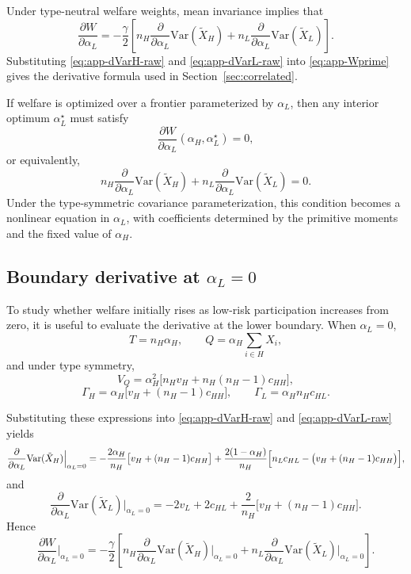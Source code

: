 \documentclass[a4paper,12pt]{article}
\theoremstyle{definition}
\theoremstyle{remark}
\newcommand{\Var}{\mathrm{Var}}
\newcommand{\1}{\mathbf{1}}
\begin{document}
Under type-neutral welfare weights, mean invariance implies that
\begin{equation}
\frac{\partial W}{\partial \alpha_L}
=
-\frac{\gamma}{2}
\left[
n_H\frac{\partial}{\partial \alpha_L}\Var(\tilde X_H)
+
n_L\frac{\partial}{\partial \alpha_L}\Var(\tilde X_L)
\right].
\label{eq:app-Wprime}
\end{equation}
Substituting \eqref{eq:app-dVarH-raw} and \eqref{eq:app-dVarL-raw} into
\eqref{eq:app-Wprime} gives the derivative formula used in
Section~\ref{sec:correlated}.

If welfare is optimized over a frontier parameterized by \(\alpha_L\), then any
interior optimum \(\alpha_L^\star\) must satisfy
\begin{equation}
\frac{\partial W}{\partial \alpha_L}(\alpha_H,\alpha_L^\star)=0,
\label{eq:app-FOC}
\end{equation}
or equivalently,
\begin{equation}
n_H\frac{\partial}{\partial \alpha_L}\Var(\tilde X_H)
+
n_L\frac{\partial}{\partial \alpha_L}\Var(\tilde X_L)
=0.
\label{eq:app-FOC-var}
\end{equation}
Under the type-symmetric covariance parameterization, this condition becomes a
nonlinear equation in \(\alpha_L\), with coefficients determined by the
primitive moments and the fixed value of \(\alpha_H\).

\subsection{Boundary derivative at \texorpdfstring{\(\alpha_L=0\)}{alphaL=0}}
\label{app:alphaL-boundary}

To study whether welfare initially rises as low-risk participation increases
from zero, it is useful to evaluate the derivative at the lower boundary. When
\(\alpha_L=0\),
\[
T=n_H\alpha_H,
\qquad
Q=\alpha_H\sum_{i\in H}X_i,
\]
and under type symmetry,
\[
V_Q
=
\alpha_H^2\bigl[n_Hv_H+n_H(n_H-1)c_{HH}\bigr],
\]
\[
\Gamma_H
=
\alpha_H\bigl[v_H+(n_H-1)c_{HH}\bigr],
\qquad
\Gamma_L
=
\alpha_Hn_Hc_{HL}.
\]

Substituting these expressions into \eqref{eq:app-dVarH-raw} and
\eqref{eq:app-dVarL-raw} yields
\begin{equation}
\frac{\partial}{\partial \alpha_L}\Var(\tilde X_H)\Big|_{\alpha_L=0}
=
-\frac{2\alpha_H}{n_H}
\bigl[v_H+(n_H-1)c_{HH}\bigr]
+
\frac{2(1-\alpha_H)}{n_H}
\Bigl[n_Lc_{HL}-\bigl(v_H+(n_H-1)c_{HH}\bigr)\Bigr],
\label{eq:app-boundary-dVarH}
\end{equation}
and
\begin{equation}
\frac{\partial}{\partial \alpha_L}\Var(\tilde X_L)\Big|_{\alpha_L=0}
=
-2v_L
+
2c_{HL}
+
\frac{2}{n_H}
\bigl[v_H+(n_H-1)c_{HH}\bigr].
\label{eq:app-boundary-dVarL}
\end{equation}
Hence
\begin{equation}
\frac{\partial W}{\partial \alpha_L}\Big|_{\alpha_L=0}
=
-\frac{\gamma}{2}
\left[
n_H\frac{\partial}{\partial \alpha_L}\Var(\tilde X_H)\Big|_{\alpha_L=0}
+
n_L\frac{\partial}{\partial \alpha_L}\Var(\tilde X_L)\Big|_{\alpha_L=0}
\right].
\label{eq:app-boundary-W}
\end{equation}
\end{document}
